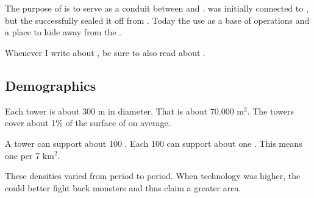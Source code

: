 \section{\Nyx}
\index{\Nyx}

The purpose of \Nyx{} is to serve as a conduit between \Erebos{} and \Miith{}. 
\Nyx{} was initially connected to \Erebos{}, but the \dragons{} successfully sealed it off from \Erebos{}. 
Today the \banes{} use \Nyx{} as a base of operations and a place to hide away from the \dragons{}. 




Whenever I write about \Nyx, be sure to also read about .









\subsection{Demographics}
Each tower is about 300 m in diameter.
That is about 70.000 m${}^2$.
The towers cover about 1\% of the surface of \Nyx on average.

A tower can support about 100 \humans.
Each 100 \humans can support about one \resphan. 
This means one \resphan per 7 km${}^2$.

These densities varied from period to period. 
When technology was higher, the \resphain could better fight back monsters and thus claim a greater area.









